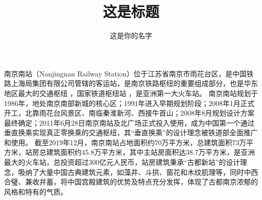 \documentclass[bachelor]{njupthesis}
\title{这是标题}
\author{这是你的名字}
\begin{document}

\makecover %

\begin{chineseabstract} %
南京南站（Nanjingnan Railway Station）位于江苏省南京市雨花台区，是中国铁路上海局集团有限公司管辖的客运站，是南京铁路枢纽的重要组成部分，也是华东地区最大的交通枢纽 ，国家铁道枢纽站 ，是亚洲第一大火车站。
南京南站规划于1986年，地处南京南部新城的核心区；1991年进入早期规划阶段；2008年1月正式开工，北靠雨花台风景区、南临秦淮新河、西接牛首山；2008年8月规划设计方案最终确定；2011年6月28日南京南站及北广场正式投入使用，成为中国第一个通过垂直换乘实现真正零换乘的交通枢纽，其“垂直换乘”的设计理念被铁道部全面推广和使用。 
截至2019年12月，南京南站占地面积约70万平方米，总建筑面积73万平方米，站房总建筑面积约45.8万平方米，其中主站房面积达38.7万平方米，是亚洲最大的火车站，总投资超过300亿元人民币，站房建筑秉承“古都新站”的设计理念，吸纳了大量中国古典建筑元素，如藻井、斗拱、窗花和木纹肌理等，同时中西合璧、兼收并蓄，将中国宫殿建筑的优势及特点充分发挥，体现了古都南京浓郁的风格和特有的气质。


\end{chineseabstract}
\end{document}
